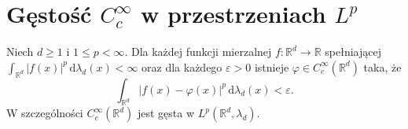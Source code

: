 \section{Gęstość $C_c^\infty$ w przestrzeniach $L^p$}

\begin{twierdzenie}
\label{thm:cc-in-lp-10}
Niech $d\ge1$ i $1\le p<\infty$.
Dla każdej funkcji mierzalnej
$f:\mathbb R^d\to\mathbb R$ spełniającej
$\int_{\mathbb R^d}|f(x)|^p\,\mathrm d\lambda_d(x)
<\infty$ oraz dla każdego $\varepsilon>0$
istnieje $\varphi\in C_c^\infty(\mathbb R^d)$ taka, że
\begin{equation}\label{eq:lp-smooth-dense-10}
\int_{\mathbb R^d}|f(x)-\varphi(x)|^p
\,\mathrm d\lambda_d(x)<\varepsilon.
\end{equation}
W szczególności $C_c^\infty(\mathbb R^d)$ jest
gęsta w $L^p(\mathbb R^d,\lambda_d)$.
\end{twierdzenie}
